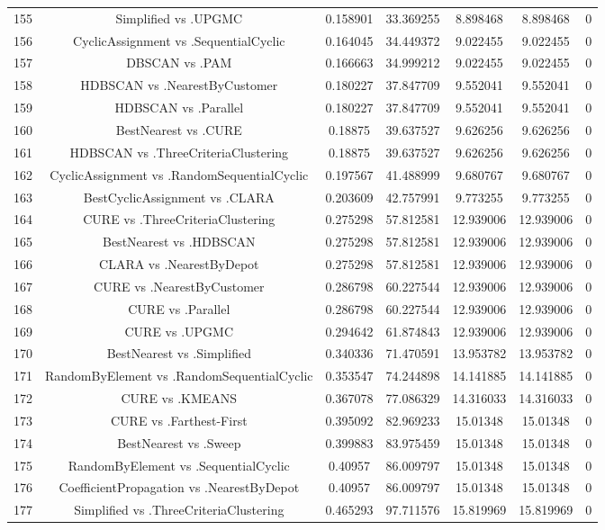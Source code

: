 \documentclass[a4paper,10pt]{article}
\begin{document}
\begin{landscape}
\begin{table}[!htp]
\begin{tabular}{ccccccc}
155&Simplified vs .UPGMC&0.158901&33.369255&8.898468&8.898468&0\\
156&CyclicAssignment vs .SequentialCyclic&0.164045&34.449372&9.022455&9.022455&0\\
157&DBSCAN vs .PAM&0.166663&34.999212&9.022455&9.022455&0\\
158&HDBSCAN vs .NearestByCustomer&0.180227&37.847709&9.552041&9.552041&0\\
159&HDBSCAN vs .Parallel&0.180227&37.847709&9.552041&9.552041&0\\
160&BestNearest vs .CURE&0.18875&39.637527&9.626256&9.626256&0\\
161&HDBSCAN vs .ThreeCriteriaClustering&0.18875&39.637527&9.626256&9.626256&0\\
162&CyclicAssignment vs .RandomSequentialCyclic&0.197567&41.488999&9.680767&9.680767&0\\
163&BestCyclicAssignment vs .CLARA&0.203609&42.757991&9.773255&9.773255&0\\
164&CURE vs .ThreeCriteriaClustering&0.275298&57.812581&12.939006&12.939006&0\\
165&BestNearest vs .HDBSCAN&0.275298&57.812581&12.939006&12.939006&0\\
166&CLARA vs .NearestByDepot&0.275298&57.812581&12.939006&12.939006&0\\
167&CURE vs .NearestByCustomer&0.286798&60.227544&12.939006&12.939006&0\\
168&CURE vs .Parallel&0.286798&60.227544&12.939006&12.939006&0\\
169&CURE vs .UPGMC&0.294642&61.874843&12.939006&12.939006&0\\
170&BestNearest vs .Simplified&0.340336&71.470591&13.953782&13.953782&0\\
171&RandomByElement vs .RandomSequentialCyclic&0.353547&74.244898&14.141885&14.141885&0\\
172&CURE vs .KMEANS&0.367078&77.086329&14.316033&14.316033&0\\
173&CURE vs .Farthest-First&0.395092&82.969233&15.01348&15.01348&0\\
174&BestNearest vs .Sweep&0.399883&83.975459&15.01348&15.01348&0\\
175&RandomByElement vs .SequentialCyclic&0.40957&86.009797&15.01348&15.01348&0\\
176&CoefficientPropagation vs .NearestByDepot&0.40957&86.009797&15.01348&15.01348&0\\
177&Simplified vs .ThreeCriteriaClustering&0.465293&97.711576&15.819969&15.819969&0\\

\end{tabular}
\end{table}
\end{landscape}
\end{document}
